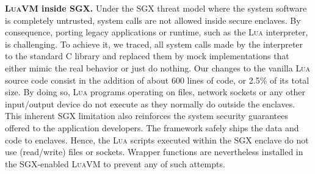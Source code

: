\vspace{10pt}\noindent\textbf{\textsc{LuaVM} inside SGX.}
Under the SGX threat model where the system software is completely untrusted, system calls are not allowed inside secure enclaves.
By consequence, porting legacy applications or runtime, such as the \textsc{Lua} interpreter, is challenging.
To achieve it, we traced, all system calls made by the interpreter to the standard C library and replaced them by mock implementations that either mimic the real behavior or just do nothing.
Our changes to the vanilla \textsc{Lua} source code consist in the addition of about $600$ lines of code, or 2.5\% of its total size.
By doing so, \textsc{Lua} programs operating on files, network sockets or any other input/output device do not execute as they normally do outside the enclaves. %
This inherent SGX limitation also reinforces the system security guarantees offered to the application developers.
The \SYS{} framework safely ships the data and code to enclaves.
Hence, the \textsc{Lua} scripts executed within the SGX enclave do not use (read/write) files or sockets.
Wrapper functions are nevertheless installed in the SGX-enabled \textsc{LuaVM} to prevent any of such attempts.

